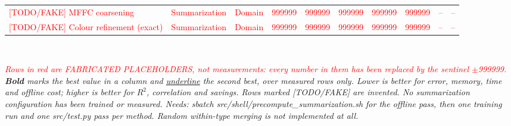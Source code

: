 \begin{table}[htbp]
{\begin{tabular}{lllrrrrrrr}
\textcolor{red}{{[TODO/FAKE] MFFC coarsening}} & \textcolor{red}{Summarization} & \textcolor{red}{Domain} & \textcolor{red}{999999} & \textcolor{red}{999999} & \textcolor{red}{999999} & \textcolor{red}{999999} & \textcolor{red}{999999} & \textcolor{red}{--} & \textcolor{red}{--} \\
\textcolor{red}{{[TODO/FAKE] Colour refinement (exact)}} & \textcolor{red}{Summarization} & \textcolor{red}{Domain} & \textcolor{red}{999999} & \textcolor{red}{999999} & \textcolor{red}{999999} & \textcolor{red}{999999} & \textcolor{red}{999999} & \textcolor{red}{--} & \textcolor{red}{--} \\
\bottomrule
\end{tabular}
}
\\[4pt]\begin{minipage}{\linewidth}\footnotesize\emph{\textcolor{red}{Rows in red are FABRICATED PLACEHOLDERS, not measurements: every number in them has been replaced by the sentinel $\pm$999999.} \textbf{Bold} marks the best value in a column and \underline{underline} the second best, over measured rows only. Lower is better for error, memory, time and offline cost; higher is better for $R^2$, correlation and savings. Rows marked [TODO/FAKE] are invented. No summarization configuration has been trained or measured. Needs: sbatch src/shell/precompute\_summarization.sh for the offline pass, then one training run and one src/test.py pass per method. Random within-type merging is not implemented at all.}\end{minipage}
\end{table}
